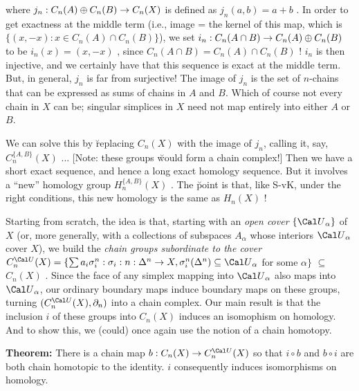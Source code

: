 \ssk


\ssk

where $j_n:C_n(A)\oplus C_n(B) \rightarrow C_n(X)$ is defined as $j_n(a,b)=a+b$ . In order to get exactness
at the middle term (i.e., image = the kernel of this map, which is $\{ (x,-x) : x\in C_n(A)\cap C_n(B)\}$),
we set $i_n:C_n(A\cap B) \rightarrow C_n(A)\oplus C_n(B)$ to be $i_n(x) = (x,-x)$ , since
$C_n(A\cap B) = C_n(A)\cap C_n(B)$ ! $i_n$ is then injective, and we certainly have that
this sequence is exact at the middle term. But, in general, $j_n$ is far from surjective! The image of $j_n$
is the set of $n$-chains that can be expressed as sums of chains in $A$ and $B$. Which of course
not every chain in $X$ can be; singular simplices in $X$ need not map entirely
into either $A$ or $B$. 

\msk

We can solve this by \u{replacing} $C_n(X)$ with the image of $j_n$, calling it, say,
$C_n^{\{A,B\}}(X)$ ... [Note: these groups \u{would} form a chain complex!]
Then we have a short exact sequence, and hence a long exact homology sequence.
But it involves a ``new'' homology group $H_n^{\{A,B\}}(X)$ . The \u{point} is that, like S-vK,
under the right conditions, this new homology is the same as $H_n(X)$ !

\msk

Starting from scratch, the idea is that, starting with an {\it open cover} $\{{\Cal U}_\alpha\}$
of $X$ (or, more generally, with a collections of subspaces $A_\alpha$ whose interiors 
${\Cal U}_\alpha$ cover $X$), we build the {\it chain groups subordinate to the cover} 
$C_n^{\Cal U}(X) = \{\sum a_i \sigma_i^n : \sigma_i : n:\Delta^n\ra X , \sigma_i^n(\Delta^n)\subseteq {\Cal U}_\alpha$
for some $\alpha\}$ $\subseteq$ $C_n(X)$ . 
Since the face of any simplex mapping into ${\Cal U}_\alpha$ also maps into ${\Cal U}_\alpha$,
our ordinary boundary maps induce boundary maps on these groups, turning
$(C_n^{\Cal U}(X),\partial_n)$ into a chain complex. Our main result is that the inclusion
$i$ of these groups into $C_n(X)$ induces an isomophism on homology. And to show this, we (could) once
again use the notion of a chain homotopy.

\msk

{\bf Theorem:} There is a chain map $b:C_n(X)\ra C_n^{\Cal U}(X)$ so that $i\circ b$ and $b\circ i$ are both chain 
homotopic to the identity. $i$ consequently induces isomorphisms on homology.

